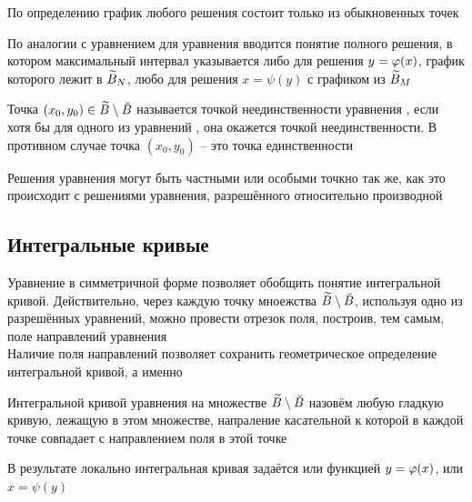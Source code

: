 \begin{remark}
	По определению график любого решения состоит только из обыкновенных точек
\end{remark}

\begin{remark}
    По аналогии с уравнением  для уравнения  вводится понятие полного решения, в котором максимальный интервал указывается либо для решения $ y = \varphi(x) $, график которого лежит в $ \widetilde{B}_N $, любо для решения $ x = \psi(y) $ с графиком из $ \widetilde{B}_M $
\end{remark}


\begin{definition}
    Точка $ (x_0, y_0) \in \widetilde{B} \setminus \breve{B} $ называется точкой неединственности уравнения , если хотя бы для одного из уравнений ,  она окажется точкой неединственности. В противном случае точка $ (x_0, y_0) $ -- это точка единственности
\end{definition}

\begin{remark}
    Решения уравнения  могут быть частными или особыми точкно так же, как это происходит с решениями уравнения, разрешённого относительно производной
\end{remark}

\subsection{Интегральные кривые}

Уравнение в симметричной форме позволяет обобщить понятие интегральной кривой. Действительно, через каждую точку мноежства $ \widetilde{B} \setminus \breve{B} $, используя одно из разрешённых уравнений, можно провести отрезок поля, построив, тем самым, поле направлений уравнения  \\
Наличие поля направлений позволяет сохранить геометрическое определение интегральной кривой, а именно

\begin{definition}
    Интегральной кривой уравнения  на множестве $ \widetilde{B} \setminus \breve{B} $ назовём любую гладкую кривую, лежащую в этом множестве, напраление касательной к которой в каждой точке совпадает с направлением поля в этой точке
\end{definition}

В результате локально интегральная кривая задаётся или функцией $ y = \varphi(x) $, или $ x = \psi(y) $

